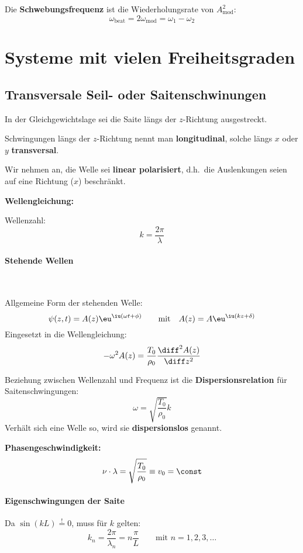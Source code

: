 		Die \textbf{Schwebungsfrequenz} ist die Wiederholungsrate von $A_\text{mod}^2$:
		\[
			\omega_\text{beat} = 2\omega_\text{mod} = \omega_1 - \omega_2
		\]
\section{Systeme mit vielen Freiheitsgraden} %
	\subsection{Transversale Seil- oder Saitenschwinungen} %
		In der Gleichgewichtslage sei die Saite längs der $z$-Richtung ausgestreckt.
		
		Schwingungen längs der $z$-Richtung nennt man \textbf{longitudinal}, solche längs $x$ oder $y$ \textbf{transversal}.
		
		Wir nehmen an, die Welle sei \textbf{linear polarisiert}, d.h.~die Auslenkungen seien auf eine Richtung ($x$) beschränkt.
		
		\textbf{Wellengleichung:}
		
		Wellenzahl:
		\[
			k = \frac{2\pi}\lambda
		\]
		
		\paragraph{Stehende Wellen} %
			~
			
			Allgemeine Form der stehenden Welle:
			\[
				\psi(z,t) = A(z) \eu^{\iu(\omega t + \phi)} \qquad \text{mit} \quad A(z) = A\eu^{\iu(kz+\delta)}
			\]
			Eingesetzt in die Wellengleichung:
			\begin{equation}
				\label{eq:wellengleichung_saite}
				-\omega^2 A(z) = \frac{T_0}{\rho_0} \frac{\diff^2 A(z)}{\diff z^2}
			\end{equation}
			
			Beziehung zwischen Wellenzahl und Frequenz ist die \textbf{Dispersionsrelation} für Saitenschwingungen:
			\[
				\omega = \sqrt{\frac{T_0}{\rho_0}}k
			\]
			Verhält sich eine Welle so, wird sie \textbf{dispersionslos} genannt.
			
			\textbf{Phasengeschwindigkeit:}
			\[
				\nu \cdot \lambda = \sqrt{\frac{T_0}{\rho_0}} \equiv v_0 = \const
			\]
		\paragraph{Eigenschwingungen der Saite} %
			Da $\sin(kL) \overset{!}= 0$, muss für $k$ gelten:
			\[
				k_n = \frac{2\pi}{\lambda_n} = n \frac \pi L \qquad \text{mit } n = 1,2,3,\dots
			\]
			
